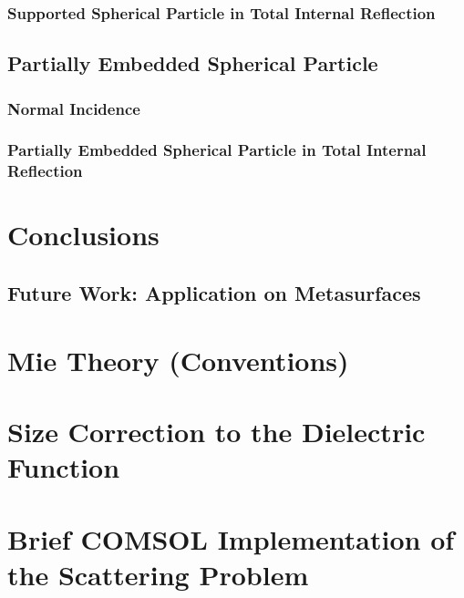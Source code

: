\documentclass[11pt]{Latex/Classes/PhDthesisPSnPDF}
\begin{document}
         \subsection{Supported Spherical Particle in Total Internal Reflection}
         \label{s:TIR}
         

    \section{Partially Embedded Spherical Particle}
    \label{s:Emb}
       

       \subsection{Normal Incidence}
       
         \label{s:Emb:Normal}

        \subsection{Partially Embedded Spherical Particle in Total Internal Reflection}
        
         \label{s:Emb:Obl}
\chapter{Conclusions}
    \section{Future Work: Application on Metasurfaces}

\appendix

\chapter{Mie Theory (Conventions)}
  \label{app:MieCode}
  

\chapter{Size Correction to the Dielectric Function}
    \label{app:SizeCorrection}
    

\chapter{Brief COMSOL Implementation of the Scattering Problem}
    \label{app:COMSOL}
    
\end{document}
